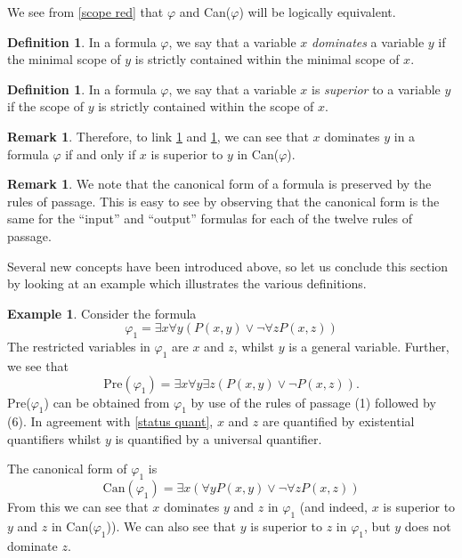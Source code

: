 \documentclass[a4paper,12pt]{report}
\theoremstyle{definition}
\newtheorem{mydef}[lem]{Definition}
\newtheorem{remark}[lem]{Remark}
\newtheorem{example}[lem]{Example}
\begin{document}
We see from \ref{scope red} that $\varphi$ and Can($\varphi$) will be logically equivalent.

\begin{mydef}
\label{dom def}
In a formula $\varphi$, we say that a variable $x$ \emph{dominates} a variable $y$ if the minimal scope of $y$ is strictly contained within the minimal scope of $x$.
\end{mydef}

\begin{mydef}
\label{sup def}
In a formula $\varphi$, we say that a variable $x$ is \emph{superior} to a variable $y$ if the scope of $y$ is strictly contained within the scope of $x$.
\end{mydef}

\begin{remark}
\label{dom sup}
Therefore, to link \ref{dom def} and \ref{sup def}, we can see that $x$ dominates $y$ in a formula $\varphi$ if and only if $x$ is superior to $y$ in Can($\varphi$).
\end{remark}

\begin{remark}
\label{canonpres}
We note that the canonical form of a formula is preserved by the rules of passage. This is easy to see by observing that the canonical form is the same for the “input” and “output” formulas for each of the twelve rules of passage.
\end{remark}

Several new concepts have been introduced above, so let us conclude this section by looking at an example which illustrates the various definitions.

\begin{example}
\label{ex1}
Consider the formula
$$
\varphi_1 = \exists x \forall y (P(x,y) \lor \neg \forall z P(x,z))
$$
The restricted variables in $\varphi_1$ are $x$ and $z$, whilst $y$ is a general variable. Further, we see that
$$
\mbox{Pre}(\varphi_1) = \exists x \forall y \exists z (P(x,y) \lor \neg P(x,z)).
$$
Pre($\varphi_1$) can be obtained from $\varphi_1$ by use of the rules of passage (1) followed by (6). In agreement with \ref{status quant}, $x$ and $z$ are quantified by existential quantifiers whilst $y$ is quantified by a universal quantifier.

The canonical form of $\varphi_1$ is
$$
\mbox{Can}(\varphi_1) = \exists x ( \forall y P(x,y) \lor \neg \forall z P(x,z))
$$
From this we can see that $x$ dominates $y$ and $z$ in $\varphi_1$ (and indeed, $x$ is superior to $y$ and $z$ in Can($\varphi_1$)). We can also see that $y$ is superior to $z$ in $\varphi_1$, but $y$ does not dominate $z$.
\end{example}
\end{document}
